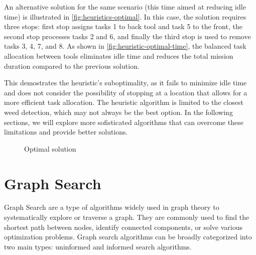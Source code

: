An alternative solution for the same scenario (this time aimed at reducing idle time) is illustrated in \autoref{fig:heuristics-optimal}. In this case, the solution requires three stops: first stop assigns tasks 1 to back tool and task 5 to the front, the second stop processes tasks 2 and 6, and finally the third stop is used to remove tasks 3, 4, 7, and 8. As shown in \autoref{fig:heuristic-optimal-time}, the balanced task allocation between tools eliminates idle time and reduces the total mission duration compared to the previous solution.

This demostrates the heuristic's suboptimality, as it fails to minimize idle time and does not consider the possibility of stopping at a location that allows for a more efficient task allocation. The heuristic algorithm is limited to the closest weed detection, which may not always be the best option. In the following sections, we will explore more sofisticated algorithms that can overcome these limitations and provide better solutions. 

\begin{figure}[hbt]
    \myfloatalign


    \caption{Optimal solution}
    \label{fig:heuristics-optimal}
\end{figure}

\section{Graph Search}
Graph Search are a type of algorithms widely used in graph theory to systematically explore or traverse a graph. They are commonly used to find the shortest path between nodes, identify connected components, or solve various optimization problems. Graph search algorithms can be broadly categorized into two main types: uninformed and informed search algorithms.

